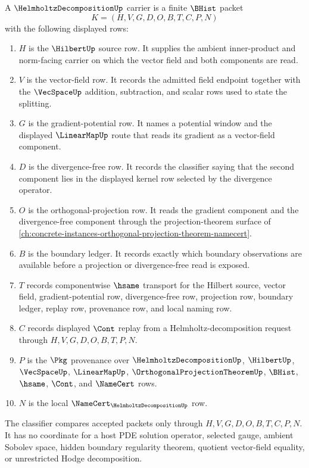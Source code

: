 \begin{definition}
\label{def:helmholtz-decomposition-carrier}
A $\HelmholtzDecompositionUp$ carrier is a finite $\BHist$ packet
$$
K=(H,V,G,D,O,B,T,C,P,N)
$$
with the following displayed rows:
\begin{enumerate}
\item $H$ is the $\HilbertUp$ source row. It supplies the ambient inner-product and norm-facing carrier on which the vector field and both components are read.
\item $V$ is the vector-field row. It records the admitted field endpoint together with the $\VecSpaceUp$ addition, subtraction, and scalar rows used to state the splitting.
\item $G$ is the gradient-potential row. It names a potential window and the displayed $\LinearMapUp$ route that reads its gradient as a vector-field component.
\item $D$ is the divergence-free row. It records the classifier saying that the second component lies in the displayed kernel row selected by the divergence operator.
\item $O$ is the orthogonal-projection row. It reads the gradient component and the divergence-free component through the projection-theorem surface of \autoref{ch:concrete-instances-orthogonal-projection-theorem-namecert}.
\item $B$ is the boundary ledger. It records exactly which boundary observations are available before a projection or divergence-free read is exposed.
\item $T$ records componentwise $\hsame$ transport for the Hilbert source, vector field, gradient-potential row, divergence-free row, projection row, boundary ledger, replay row, provenance row, and local naming row.
\item $C$ records displayed $\Cont$ replay from a Helmholtz-decomposition request through $H,V,G,D,O,B,T,P,N$.
\item $P$ is the $\Pkg$ provenance over $\HelmholtzDecompositionUp$, $\HilbertUp$, $\VecSpaceUp$, $\LinearMapUp$, $\OrthogonalProjectionTheoremUp$, $\BHist$, $\hsame$, $\Cont$, and $\NameCert$ rows.
\item $N$ is the local $\NameCert_{\HelmholtzDecompositionUp}$ row.
\end{enumerate}
The classifier compares accepted packets only through $H,V,G,D,O,B,T,C,P,N$. It has no coordinate for a host PDE solution operator, selected gauge, ambient Sobolev space, hidden boundary regularity theorem, quotient vector-field equality, or unrestricted Hodge decomposition.
\end{definition}

